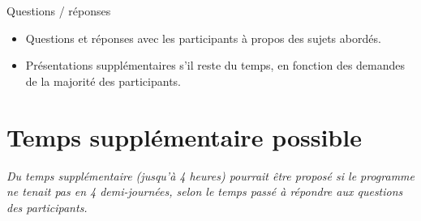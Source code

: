 \documentclass[a4paper,12pt,obeyspaces,spaces,hyphens]{article}
\begin{document}
\feagendaonecolumn
{Questions / réponses}
{
  \begin{itemize}
  \item Questions et réponses avec les participants à propos des sujets abordés.
  \item Présentations supplémentaires s'il reste du temps, en fonction des demandes
        de la majorité des participants.
  \end{itemize}
}

\section{Temps supplémentaire possible}

{\em Du temps supplémentaire (jusqu'à 4 heures) pourrait être proposé si le programme ne tenait
     pas en 4 demi-journées, selon le temps passé à répondre aux questions des participants.}
\end{document}

